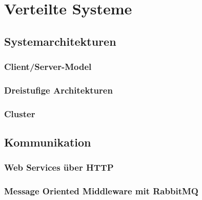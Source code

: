 \chapter{Verteilte Systeme}
\label{sec:verteiltesysteme}

\section{Systemarchitekturen}

\subsection{Client/Server-Model}

\subsection{Dreistufige Architekturen}

\subsection{Cluster}

\section{Kommunikation}

\subsection{Web Services über HTTP}

\subsection{Message Oriented Middleware mit RabbitMQ}